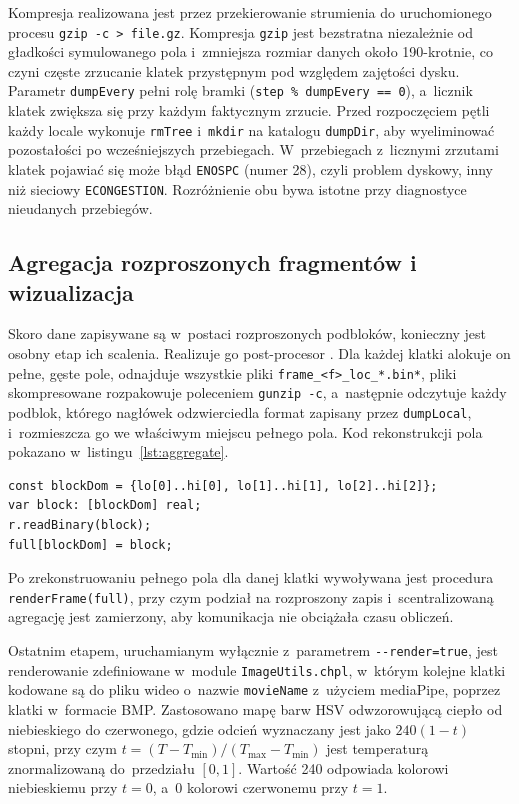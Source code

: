Kompresja realizowana jest przez przekierowanie strumienia do uruchomionego procesu \texttt{gzip -c > file.gz}. 
Kompresja \texttt{gzip} jest bezstratna niezależnie od gładkości symulowanego pola i~zmniejsza rozmiar danych około \num{190}-krotnie, co czyni częste zrzucanie klatek przystępnym pod względem zajętości dysku. 
Parametr \texttt{dumpEvery} pełni rolę bramki (\texttt{step \% dumpEvery == 0}), a~licznik klatek zwiększa się przy każdym faktycznym zrzucie. Przed rozpoczęciem pętli każdy locale wykonuje \texttt{rmTree} i~\texttt{mkdir} na katalogu \texttt{dumpDir}, aby wyeliminować pozostałości po wcześniejszych przebiegach. W~przebiegach z~licznymi zrzutami klatek pojawiać się może błąd \texttt{ENOSPC} (numer \num{28}), czyli problem dyskowy, inny niż sieciowy \texttt{ECONGESTION}. Rozróżnienie obu bywa istotne przy diagnostyce nieudanych przebiegów.

\subsection{Agregacja rozproszonych fragmentów i wizualizacja}

Skoro dane zapisywane są w~postaci rozproszonych podbloków, konieczny jest osobny etap ich scalenia. 
Realizuje go post-procesor . Dla każdej klatki alokuje on pełne, gęste pole, odnajduje wszystkie pliki \texttt{frame\_<f>\_loc\_*.bin*}, pliki skompresowane rozpakowuje poleceniem \texttt{gunzip -c},
 a~następnie odczytuje każdy podblok, którego nagłówek odzwierciedla format zapisany przez \texttt{dumpLocal}, i~rozmieszcza go we właściwym miejscu pełnego pola. Kod rekonstrukcji pola pokazano w~listingu~\ref{lst:aggregate}.

\begin{lstlisting}[language=Chapel, caption={Rekonstrukcja pełnego pola: odczyt podbloku i rozmieszczenie go we właściwym miejscu.}, label={lst:aggregate}]
const blockDom = {lo[0]..hi[0], lo[1]..hi[1], lo[2]..hi[2]};
var block: [blockDom] real;
r.readBinary(block);
full[blockDom] = block;
\end{lstlisting}

Po zrekonstruowaniu pełnego pola dla danej klatki wywoływana jest procedura \texttt{renderFrame(full)}, przy czym podział na rozproszony zapis i~scentralizowaną agregację jest zamierzony, aby komunikacja nie obciążała czasu obliczeń.

Ostatnim etapem, uruchamianym wyłącznie z~parametrem \texttt{-{}-render=true}, jest renderowanie zdefiniowane w~module \texttt{ImageUtils.chpl}, w~którym kolejne klatki kodowane są do pliku wideo o~nazwie \texttt{movieName} z~użyciem mediaPipe, poprzez klatki w~formacie BMP. 
Zastosowano mapę barw HSV odwzorowującą ciepło od niebieskiego do czerwonego, gdzie odcień wyznaczany jest jako \(240(1-t)\) stopni, przy czym \(t=(T-T_{\min})/(T_{\max}-T_{\min})\) jest temperaturą znormalizowaną do~przedziału \([0,1]\). 
Wartość \num{240} odpowiada kolorowi niebieskiemu przy \(t=0\), a~\num{0} kolorowi czerwonemu przy \(t=1\).

